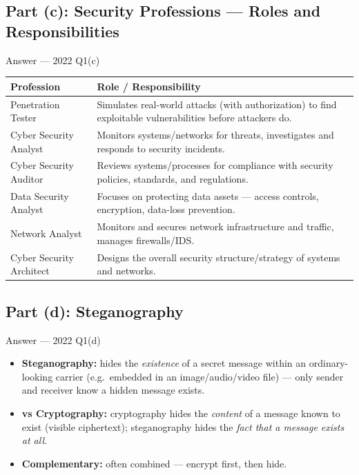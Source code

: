 \documentclass[12pt,a4paper]{article}
\begin{document}
\subsection{Part (c): Security Professions --- Roles and Responsibilities}
\begin{solbox}{Answer --- 2022 Q1(c)}
\begin{center}
\renewcommand{\arraystretch}{1.3}
\begin{tabular}{l|p{9.5cm}}
\toprule
\textbf{Profession} & \textbf{Role / Responsibility} \\
\midrule
Penetration Tester & Simulates real-world attacks (with authorization) to find exploitable vulnerabilities before attackers do. \\
Cyber Security Analyst & Monitors systems/networks for threats, investigates and responds to security incidents. \\
Cyber Security Auditor & Reviews systems/processes for compliance with security policies, standards, and regulations. \\
Data Security Analyst & Focuses on protecting data assets --- access controls, encryption, data-loss prevention. \\
Network Analyst & Monitors and secures network infrastructure and traffic, manages firewalls/IDS. \\
Cyber Security Architect & Designs the overall security structure/strategy of systems and networks. \\
\bottomrule
\end{tabular}
\end{center}
\end{solbox}

\subsection{Part (d): Steganography}
\begin{solbox}{Answer --- 2022 Q1(d)}
\begin{itemize}[noitemsep]
  \item \textbf{Steganography:} hides the \emph{existence} of a secret message within an ordinary-looking carrier (e.g.\ embedded in an image/audio/video file) --- only sender and receiver know a hidden message exists.
  \item \textbf{vs Cryptography:} cryptography hides the \emph{content} of a message known to exist (visible ciphertext); steganography hides the \emph{fact that a message exists at all}.
  \item \textbf{Complementary:} often combined --- encrypt first, then hide.
\end{itemize}
\end{solbox}
\end{document}
